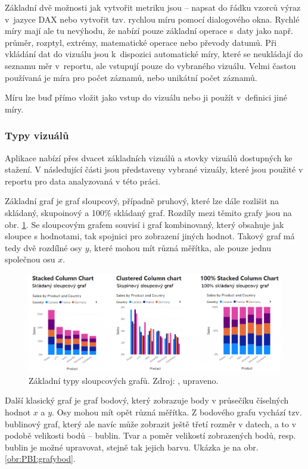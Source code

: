 Základní dvě možnosti jak vytvořit metriku jsou -- napsat do řádku vzorců výraz v~jazyce DAX nebo vytvořit tzv. rychlou míru pomocí dialogového okna. Rychlé míry mají ale tu nevýhodu, že nabízí pouze základní operace s~daty jako např. průměr, rozptyl, extrémy, matematické operace nebo převody datumů. 
Při vkládání dat do vizuálu jsou k~dispozici automatické míry, které se neukládají do seznamu měr v~reportu, ale vstupují pouze do vybraného vizuálu. Velmi častou používaná je míra pro počet záznamů, nebo unikátní počet záznamů.

Míru lze buď přímo vložit jako vstup do vizuálu nebo ji použít v~definici jiné míry.

\subsubsection*{Typy vizuálů}

Aplikace nabízí přes dvacet základních vizuálů a stovky vizuálů dostupných ke stažení. V následující části jsou představeny vybrané vizuály, které jsou použité v reportu pro data analyzovaná v této práci. 

Základní graf je graf sloupcový, případně pruhový, které lze dále rozlišit na skládaný, skupoinový a 100\% skládaný graf. Rozdíly mezi těmito grafy jsou na obr. \ref*{obr:PBI:grafy}. Se sloupcovým grafem souvisí i graf kombinovaný, který obsahuje jak sloupce s hodnotami, tak spojnici pro zobrazení jiných hodnot. Takový graf má tedy dvě rozdílné osy $y$, které mohou mít různá měřítka, ale pouze jednu společnou osu $x$.

\begin{figure}[h!]
    \centering
    \captionsetup{justification=centering}
    \includegraphics[width=\textwidth]{obrazky/PBIteorie/sloupcove_grafy.png}
    \caption{Základní typy sloupcových grafů. 
    Zdroj: \cite{bib:PBIgrafy}, upraveno.}
    \label{obr:PBI:grafy}
\end{figure}

Další klasický graf je graf bodový, který zobrazuje body v průsečíku číselných hodnot $x$  a $y$. Osy mohou mít opět různá měřítka. Z bodového grafu vychází tzv. bublinový graf, který ale navíc může zobrazit ještě třetí rozměr v datech, a to v podobě velikosti bodů -- bublin. Tvar a poměr velikostí zobrazených bodů, resp. bublin je možné upravovat, stejně tak jejich barvu. Ukázka je na obr. \ref*{obr:PBI:grafybod}.

